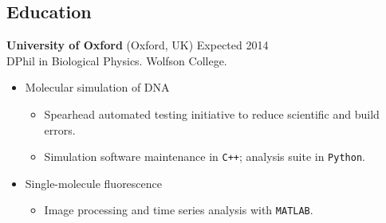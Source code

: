 \documentclass[margin]{res}
\newcommand{\locdatesubsection}[3]{\textbf{#1} (#2) \hfill #3}
\begin{document}
 
\begin{sloppypar}
 
 

\address{2115 Cloville Avenue\\
         Baltimore, MD 21214\\
         \texttt{+}1 443 257 5953}
\address{\texttt{ryan.m.harrison@gmail.com}\\
         \texttt{linkedin.com/in/rmharri}\\
         \texttt{github.com/rmharrison}}
\address{Wolfson College\\ 
         Oxford OX2 6UD\\
         \texttt{+}44 07523 229446}

\begin{resume} 
\setlength{\parskip}{1.00ex}
\setlength{\parindent}{0pt}
 
\section{Education} 
\locdatesubsection{University of Oxford}{Oxford, UK}{Expected 2014}\\
DPhil in Biological Physics. Wolfson College.

\begin{itemize}
\item Molecular simulation of DNA
    \begin{itemize}
    \item Spearhead automated testing initiative to reduce scientific and build errors.
    \item Simulation software maintenance in \texttt{C++}; analysis suite in \texttt{Python}.
    \end{itemize}
\item Single-molecule fluorescence
    \begin{itemize}
    \item Image processing and time series analysis with \textsc{\texttt{MATLAB}}. 
    \end{itemize}
\end{itemize}


\end{resume}
\end{sloppypar}
\end{document}
